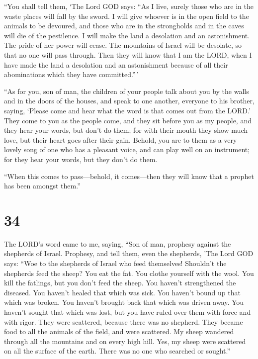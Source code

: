  ``You shall tell them, `The Lord GOD says: ``As I live,
surely those who are in the waste places will fall by the sword. I will
give whoever is in the open field to the animals to be devoured, and
those who are in the strongholds and in the caves will die of the
pestilence.  I will make the land a desolation and an
astonishment. The pride of her power will cease. The mountains of Israel
will be desolate, so that no one will pass through.  Then
they will know that I am the LORD, when I have made the land a
desolation and an astonishment because of all their abominations which
they have committed.''\,'

 ``As for you, son of man, the children of your people
talk about you by the walls and in the doors of the houses, and speak to
one another, everyone to his brother, saying, `Please come and hear what
the word is that comes out from the LORD.'  They come to
you as the people come, and they sit before you as my people, and they
hear your words, but don't do them; for with their mouth they show much
love, but their heart goes after their gain.  Behold, you
are to them as a very lovely song of one who has a pleasant voice, and
can play well on an instrument; for they hear your words, but they don't
do them.

 ``When this comes to pass---behold, it comes---then they
will know that a prophet has been amongst them.''

\hypertarget{section-32}{%
\section{34}\label{section-32}}

 The LORD's word came to me, saying,  ``Son
of man, prophesy against the shepherds of Israel. Prophesy, and tell
them, even the shepherds, 'The Lord GOD says: ``Woe to the shepherds of
Israel who feed themselves! Shouldn't the shepherds feed the sheep?
 You eat the fat. You clothe yourself with the wool. You
kill the fatlings, but you don't feed the sheep.  You
haven't strengthened the diseased. You haven't healed that which was
sick. You haven't bound up that which was broken. You haven't brought
back that which was driven away. You haven't sought that which was lost,
but you have ruled over them with force and with rigor. 
They were scattered, because there was no shepherd. They became food to
all the animals of the field, and were scattered.  My
sheep wandered through all the mountains and on every high hill. Yes, my
sheep were scattered on all the surface of the earth. There was no one
who searched or sought.''

